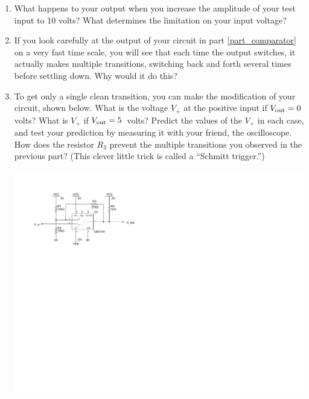 \begin{enumerate}[wide]
\item What happens to your output when you increase the amplitude of your test input to 10 volts?  What determines the limitation on your input voltage?

\item If you look carefully at the output of your circuit in part \ref{part_comparator} on a very fast time scale, you will see that each time the output switches, it actually makes multiple transitions, switching back and forth several times before settling down.  Why would it do this?  

\item To get only a single clean transition, you can make the modification of your circuit, shown below.  What is the voltage $V_+$ at the positive input if $V_{\rm out}=0$ volts?  What is $V_+$ if $V_{\rm out}=5$~volts?   Predict the values of the $V_+$ in each case, and test your prediction by measuring it with your friend, the oscilloscope.  How does the resistor $R_3$ prevent the multiple transitions you observed in the previous part?  (This clever little trick is called a ``Schmitt trigger.'') \label{part_schmitt_trigger}

\begin{center}
\includegraphics{digital_electronics/schmitt_trigger.pdf}
\end{center}


\end{enumerate}


